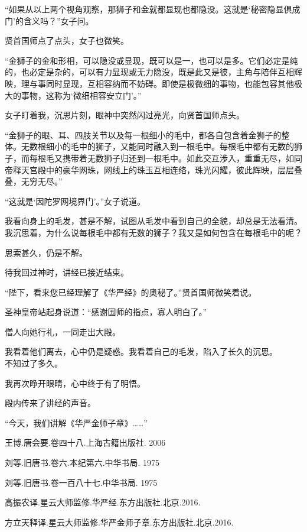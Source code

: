 \documentclass[UTF8,openany]{ctexbook}
\begin{document}
“如果从以上两个视角观察，那狮子和金就都显现也都隐没。这就是‘秘密隐显俱成门’的含义吗？”女子问。

贤首国师点了点头，女子也微笑。

“金狮子的金和形相，可以隐没或显现，既可以是一，也可以是多。它们必定是纯的，也必定是杂的，可以有力显现或无力隐没，既是此又是彼，主角与陪伴互相辉映，理与事同时显现，互相容纳而不妨碍。即使是极微细的事物，也能包容其他极大的事物，这称为‘微细相容安立门’\cite{bi:hy}。”

女子盯着我，沉思片刻，眼神中突然闪过亮光，向贤首国师点头。

“金狮子的眼、耳、四肢关节以及每一根细小的毛中，都各自包含着金狮子的整体。无数根细小的毛中的狮子，又能同时融入到一根毛中。每根毛中都有无数的狮子，而每根毛又携带着无数狮子归还到一根毛中。如此交互涉入，重重无尽，如同帝释天宫殿中的豪华网珠，网线上的珠玉互相连络，珠光闪耀，彼此辉映，层层叠叠，无穷无尽\cite{bi:hy}。”

“这就是‘因陀罗网境界门’。”女子说道。

我看向身上的毛发，甚是不解，试图从毛发中看到自己的全貌，却总是无法看清。我沉思着，为什么说每根毛中都有无数的狮子？我又是如何包含在每根毛中的呢？

思索甚久，仍是不解。

待我回过神时，讲经已接近结束。

“陛下，看来您已经理解了《华严经》的奥秘了。”贤首国师微笑着说。

圣神皇帝站起身说道：“感谢国师的指点，寡人明白了。”

僧人向她行礼，一同走出大殿。

我看着他们离去，心中仍是疑惑。我看着自己的毛发，陷入了长久的沉思。\\[1em]

不知过了多久。

我再次睁开眼睛，心中终于有了明悟。

殿内传来了讲经的声音。

“今天，我们讲解《华严金师子章》……”
















\newpage

\begin{thebibliography}{99}
王博.唐会要.卷四十八.上海古籍出版社. 2006

刘{}等.旧唐书.卷六.本纪第六.中华书局. 1975

刘{}等.旧唐书.卷一百八十七.中华书局. 1975

高振农译.星云大师监修.华严经.东方出版社.北京.2016.

方立天释译.星云大师监修.华严金师子章.东方出版社.北京.2016.
\end{thebibliography}
\end{document}
